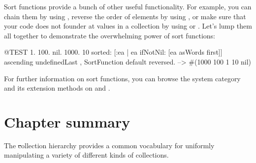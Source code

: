 \documentclass[a4paper,10pt,twoside]{book}
\begin{document}
Sort functions provide a bunch of other useful functionality.
For example, you can chain them by using , reverse the order of elements by using , or make sure that your code does not founder at  values in a collection by using  or .
Let's lump them all together to demonstrate the overwhelming power of sort functions:

\begin{code}{@TEST}
{1. 100. nil. 1000. 10} sorted: [:ea | ea ifNotNil: [ea asWords first]] ascending undefinedLast , SortFunction default reversed. --> #(1000 100 1 10 nil)
\end{code}

For further information on sort functions, you can browse the system category  and its extension methods on  and .

\section{Chapter summary}

The \st collection hierarchy provides a common vocabulary for uniformly manipulating a variety of different kinds of collections.
\end{document}
